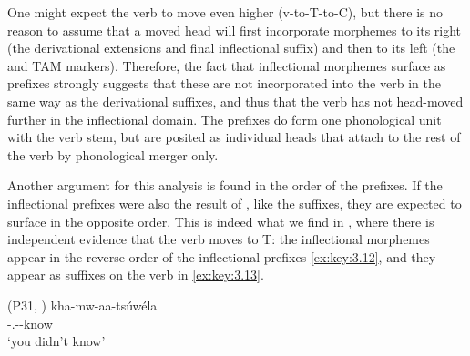 \documentclass[output=paper]{langsci/langscibook}
\begin{document}
\ea\label{ex:key:3.11}
\z
{}

One might expect the verb to move even higher (v-to-T-to-C), but there is no
reason to assume that a moved head will first incorporate morphemes to its
right (the derivational extensions and final inflectional suffix) and then to
its left (the  and \gls{TAM} markers). Therefore, the fact that
inflectional morphemes surface as prefixes strongly suggests that these are not
incorporated into the verb in the same way as the derivational suffixes, and
thus that the verb has not head-moved further in the inflectional domain. The
prefixes do form one phonological unit with the verb stem, but are posited as
individual heads that attach to the rest of the verb by phonological merger
only.

Another argument for this analysis is found in the order of the prefixes. If
the inflectional prefixes were also the result of , like the
suffixes, they are expected to surface in the opposite order. This is indeed
what we find in , where there is independent evidence that the verb moves
to T: the inflectional morphemes appear in the reverse order of the 
inflectional prefixes \eqref{ex:key:3.12}, and they appear as suffixes on the verb
in \eqref{ex:key:3.13}.

\ea\label{ex:key:3.12}  (P31, )
    \sn
    \gll kha-mw-aa-tsúwéla\\
        \Neg{}-\Spl.\Sm{}-\Ipfv{}-know\\
    \glt ‘you didn't know’
\z
\end{document}
